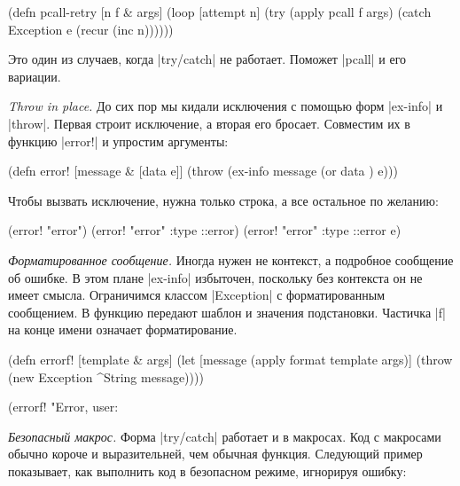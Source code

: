 \begin{english}
  \begin{clojure}
(defn pcall-retry [n f & args]
  (loop [attempt n]
    (try
      (apply pcall f args)
      (catch Exception e
        (recur (inc n))))))
  \end{clojure}
\end{english}

Это один из случаев, когда \spverb|try/catch| не работает. Поможет
\spverb|pcall| и его вариации.

\emph{Throw in place.} До сих пор мы кидали исключения с помощью форм
\spverb|ex-info| и \spverb|throw|. Первая строит исключение, а вторая его
бросает. Совместим их в функцию \spverb|error!| и упростим аргументы:

\begin{english}
  \begin{clojure}
(defn error! [message & [data e]]
  (throw (ex-info message (or data {}) e)))
  \end{clojure}
\end{english}

Чтобы вызвать исключение, нужна только строка, а все остальное по желанию:

\begin{english}
  \begin{clojure}
(error! "error")
(error! "error" {:type ::error})
(error! "error" {:type ::error} e)
  \end{clojure}
\end{english}

\emph{Форматированное сообщение.} Иногда нужен не контекст, а подробное
сообщение об ошибке. В этом плане \spverb|ex-info| избыточен, поскольку без
контекста он не имеет смысла. Ограничимся классом \spverb|Exception| с
форматированным сообщением. В функцию передают шаблон и значения
подстановки. Частичка \spverb|f| на конце имени означает форматирование.

\begin{english}
  \begin{clojure}
(defn errorf! [template & args]
  (let [message (apply format template args)]
    (throw (new Exception ^String message))))

(errorf! "Error, user: %
  \end{clojure}
\end{english}

\emph{Безопасный макрос.} Форма \spverb|try/catch| работает и в макросах. Код с
макросами обычно короче и выразительней, чем обычная функция. Следующий пример
показывает, как выполнить код в безопасном режиме, игнорируя ошибку:

